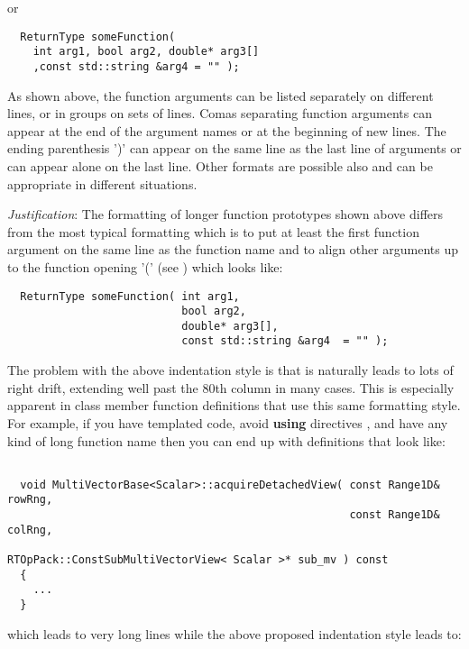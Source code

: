 \begin{enumerate}
\begin{enumerate}
  or
  
  {\small\begin{verbatim}
  ReturnType someFunction(
    int arg1, bool arg2, double* arg3[]
    ,const std::string &arg4 = "" );
  \end{verbatim}}

  As shown above, the function arguments can be listed separately on different
  lines, or in groups on sets of lines.  Comas separating function arguments
  can appear at the end of the argument names or at the beginning of new
  lines.  The ending parenthesis ')' can appear on the same line as the last
  line of arguments or can appear alone on the last line.  Other formats are
  possible also and can be appropriate in different situations.

  {}\textit{Justification}: The formatting of longer function prototypes shown
  above differs from the most typical formatting which is to put at least the
  first function argument on the same line as the function name and to align
  other arguments up to the function opening '(' (see
  {}\cite{JointStrikeFighterC++CodingStandard}) which looks like:
  
  {\small\begin{verbatim}
  ReturnType someFunction( int arg1,
                           bool arg2,
                           double* arg3[],
                           const std::string &arg4  = "" );
  \end{verbatim}}
  
  The problem with the above indentation style is that is naturally leads to
  lots of right drift, extending well past the 80th column in many cases.
  This is especially apparent in class member function definitions that use
  this same formatting style.  For example, if you have templated code, avoid
  {}\textbf{using} directives {}\cite[Item 59]{C++CodingStandards05}, and have
  any kind of long function name then you can end up with definitions that
  look like:
  
  {\small\begin{verbatim}

  void MultiVectorBase<Scalar>::acquireDetachedView( const Range1D& rowRng,  
                                                     const Range1D& colRng,  
                                                     RTOpPack::ConstSubMultiVectorView< Scalar >* sub_mv ) const
  {
    ...
  }
  \end{verbatim}}
  
  which leads to very long lines while the above proposed indentation style
  leads to:
  

\end{enumerate}
\end{enumerate}
